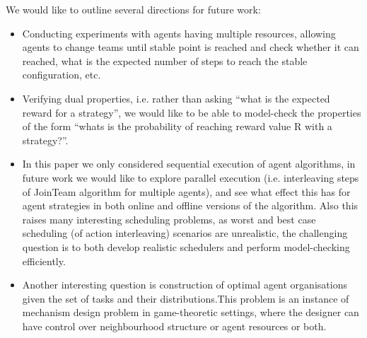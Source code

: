 \documentclass{llncs}
\begin{document}
We would like to outline several directions for future work:
\begin{itemize}

 \item Conducting experiments with agents having multiple resources, allowing agents to change teams until stable point is reached and check whether it can reached, what is the expected number of steps to reach the stable configuration, etc.

\item Verifying dual properties, i.e. rather than asking ``what is the expected reward for a strategy'', we would like to be able to model-check the properties of the form ``whats is the probability of reaching reward value R with a strategy?''.

 \item In this paper we only considered sequential execution of agent algorithms, in future work we would like to explore parallel execution (i.e. interleaving steps of JoinTeam algorithm for multiple agents), and see what effect this has for agent strategies in both online and offline versions of the algorithm. Also this raises many interesting scheduling problems, as worst and best case scheduling (of action interleaving) scenarios are unrealistic, the challenging question is to both develop realistic schedulers and perform model-checking efficiently.

 \item Another interesting question is construction of optimal agent organisations given the set of tasks and their distributions.This problem is an instance of mechanism design problem in game-theoretic settings, where the designer can have control over neighbourhood structure or agent resources or both.

\end{itemize}



\end{document}
